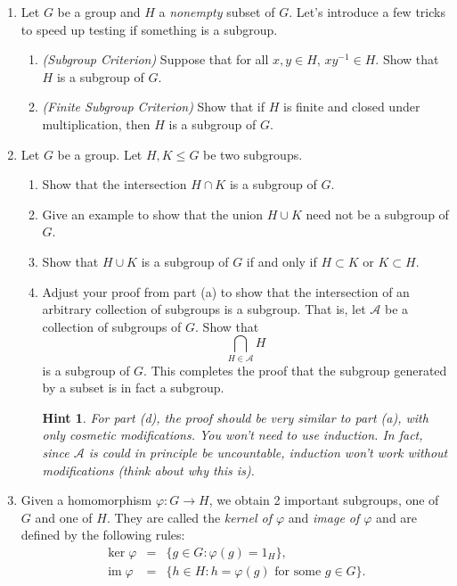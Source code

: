 \documentclass[11pt]{article}
\newtheorem*{hint}{Hint}
\newcommand{\cA}{\mathcal{A}}
\begin{document}
\begin{enumerate}
  \item Let $G$ be a group and $H$ a \textit{nonempty} subset of $G$.  Let's introduce a few tricks to speed up testing if something is a subgroup.
  \begin{enumerate}
    \item \textit{(Subgroup Criterion)} Suppose that for all $x,y\in H$, $xy^{-1}\in H$.  Show that $H$ is a subgroup of $G$.
    \item \textit{(Finite Subgroup Criterion)} Show that if $H$ is finite and closed under multiplication, then $H$ is a subgroup of $G$.
  \end{enumerate}
	\item Let $G$ be a group.  Let $H,K\le G$ be two subgroups.
  \begin{enumerate}
    \item Show that the intersection $H\cap K$ is a subgroup of $G$.
    \item Give an example to show that the union $H\cup K$ need not be a subgroup of $G$.
    \item Show that $H\cup K$ is a subgroup of $G$ if and only if $H\subset K$ or $K\subset H$.
    \item Adjust your proof from part (a) to show that the intersection of an arbitrary collection of subgroups is a subgroup.  That is, let $\cA$ be a collection of subgroups of $G$.  Show that
    \[\bigcap_{H\in\cA}H\]
    is a subgroup of $G$.  This completes the proof that the subgroup generated by a subset is in fact a subgroup.
    \begin{hint}
      For part (d), the proof should be very similar to part (a), with only cosmetic modifications.  You won't need to use induction.  In fact, since $\cA$ is could in principle be uncountable, induction won't work without modifications (think about why this is).
    \end{hint}
  \end{enumerate}
    \item Given a homomorphism $\varphi:G\to H$, we obtain 2 important subgroups, one of $G$ and one of $H$.  They are called the \textit{kernel of $\varphi$} and \textit{image of $\varphi$} and are defined by the following rules:
  \begin{eqnarray*}
    \ker\varphi &=& \{g\in G:\varphi(g) = 1_H\},\\
    \operatorname{im}\varphi &=& \{h\in H:h =\varphi(g)\text{ for some }g\in G\}.
  \end{eqnarray*}
  \begin{enumerate}

\end{enumerate}
\end{enumerate}
\end{document}
